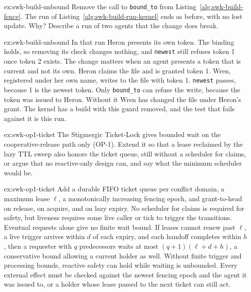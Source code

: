 \documentclass[11pt,a4paper]{article}
\theoremstyle{definition}
\theoremstyle{remark}
\begin{document}
\begin{pdexercise}[kind=Trace,rating=2]{ex:swk-build-unbound}
Remove the call to \texttt{bound\_to} from Listing~\ref{alg:swk-build-fence}. The run of Listing~\ref{alg:swk-build-run-kernel} ends as before, with no lost update. Why? Describe a run of two agents that the change does break.
\end{pdexercise}
\begin{pdsolution}{ex:swk-build-unbound}
In that run Heron presents its own token. The binding holds, so removing its check changes nothing, and \texttt{newest} still refuses token 1 once token 2 exists. The change matters when an agent presents a token that is current and not its own. Heron claims the file and is granted token 1. Wren, registered under her own name, writes to the file with token 1. \texttt{newest} passes, because 1 is the newest token. Only \texttt{bound\_to} can refuse the write, because the token was issued to Heron. Without it Wren has changed the file under Heron's grant. The kernel has a build with this guard removed, and the test that fails against it is this run.
\end{pdsolution}
\begin{pdexercise}[kind=Open,rating=3]{ex:swk-op1-ticket}
The Stigmergic Ticket-Lock gives bounded wait on the cooperative-release path only (OP-1). Extend it so that a lease reclaimed by the lazy TTL sweep also honors the ticket queue, still without a scheduler for claims, or argue that no reactive-only design can, and say what the minimum scheduler would be.
\end{pdexercise}
\begin{pdsolution}{ex:swk-op1-ticket}
Add a durable FIFO ticket queue per conflict domain, a maximum lease $\ell$, a monotonically increasing fencing epoch, and grant-to-head on release, on acquire, and on lazy expiry. No scheduler for claims is required for safety, but liveness requires some live caller or tick to trigger the transitions. Eventual requests alone give no finite wait bound. If leases cannot renew past $\ell$, a live trigger arrives within $d$ of each expiry, and each handoff completes within $h$, then a requester with $q$ predecessors waits at most $(q+1)(\ell+d+h)$, a conservative bound allowing a current holder as well. Without finite trigger and processing bounds, reactive safety can hold while waiting is unbounded. Every external effect must be checked against the newest fencing epoch and the agent it was issued to, or a holder whose lease passed to the next ticket can still act.
\end{pdsolution}
\end{document}
